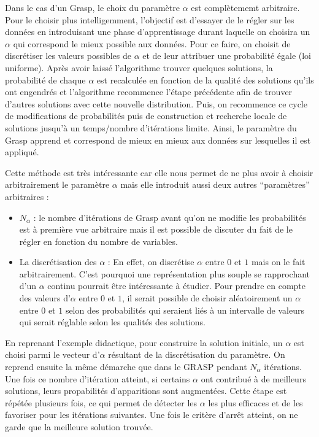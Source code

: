 Dans le cas d'un Grasp, le choix du paramètre $\alpha$ est complètememt arbitraire.
Pour le choisir plus intelligemment, l'objectif est d'essayer de le régler sur les données en introduisant une phase d'apprentissage durant laquelle on choisira un $\alpha$ qui correspond le mieux possible aux données. Pour ce faire, on choisit de discrétiser
les valeurs possibles de $\alpha$ et de leur attribuer une probabilité égale (loi uniforme).
Après avoir laissé l'algorithme trouver quelques solutions, la probabilité de chaque $\alpha$ est recalculée 
en fonction de la qualité des solutions qu'ils ont engendrés et l'algorithme recommence l'étape précédente afin de trouver d'autres
solutions avec cette nouvelle distribution. Puis, on recommence ce cycle de modifications de probabilités puis de construction et recherche locale de solutions jusqu'à un temps/nombre d'itérations limite. Ainsi,
le paramètre du Grasp apprend et correspond de mieux en mieux aux données sur lesquelles
il est appliqué.


Cette méthode est très intéressante car elle nous permet de ne plus avoir à choisir arbitrairement
le paramètre $\alpha$ mais elle introduit aussi deux autres ``paramètres'' arbitraires :
\begin{itemize}
\item $N_{\alpha}$ : le nombre d'itérations de Grasp avant qu'on ne modifie les probabilités est à première vue arbitraire mais il est possible de discuter du fait de le régler en fonction du nombre de variables.
\item La discrétisation des $\alpha$ : En effet, on discrétise $\alpha$ entre $0$ et $1$ mais on le fait arbitrairement. C'est pourquoi une représentation plus souple se rapprochant d'un $\alpha$ continu pourrait être intéressante à étudier. Pour prendre en compte des valeurs d'$\alpha$ entre $0$ et $1$, il serait possible de choisir aléatoirement un $\alpha$ entre $0$ et $1$ selon des probabilités qui seraient liés à un intervalle de valeurs qui serait réglable selon les qualités des solutions.
  \end{itemize}

En reprenant l'exemple didactique, pour construire la solution initiale, un $\alpha$ est choisi parmi le vecteur d'$\alpha$ résultant de la discrétisation du paramètre. On reprend ensuite la même démarche que dans le GRASP pendant $N_{\alpha}$ itérations. Une fois ce nombre d'itération atteint, si certains $\alpha$ ont contribué à de meilleurs solutions, leurs propabilités d'apparitions sont augmentées. Cette étape est répétée plusieurs fois, ce qui permet de détecter les $\alpha$ les plus efficaces et de les favoriser pour les itérations suivantes. Une fois le critère d'arrêt atteint, on ne garde que la meilleure solution trouvée.


